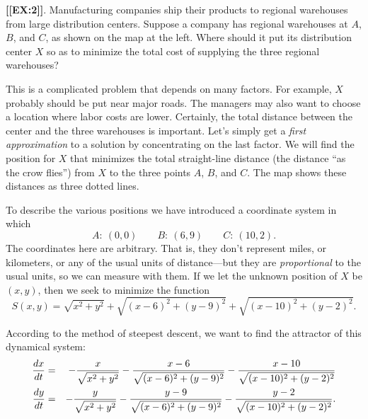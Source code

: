 {{{{




{\bf [[EX:2]]}.  Manufacturing companies ship their products to regional warehouses from large distribution centers.   Suppose a company has regional warehouses at $A$, $B$, and $C$, as shown on the map at the left.  Where should it put its distribution center $X$ so as to minimize the total cost of supplying the three regional warehouses?
\label{distribstart} 

        This is a complicated problem that depends on many factors.  For example, $X$ probably should be put near major roads.  The managers may also want to choose a location where labor costs are lower.  Certainly, the total distance between the center and the three warehouses is important.  Let's simply get a {\em first approximation\/} to a solution by concentrating on the last factor.  
We will find the position for $X$ that minimizes the total straight-line distance (the distance ``as the crow flies'') from $X$ to the three points $A$, $B$, and $C$.  The map shows these distances as three dotted lines.   

        To describe the various positions we have introduced a coordinate system in which
        \[
A: \ (0, 0) \qquad B: \  (6, 9) \qquad C: \ (10, 2).
\]
The coordinates here are arbitrary.  That is, they don't represent miles, or kilometers, or any of the usual units of distance---but they are {\em proportional\/} to the usual units, so we can measure with them.  If we let the unknown position of $X$ be $(x, y)$, then we seek to minimize the function
        \[
S(x, y) = \sqrt{x^2 + y^2} + \sqrt{(x-6)^2 + (y-9)^2} 
                + \sqrt{(x-10)^2 + (y-2)^2}.
\]

        According to the method of steepest descent, we want to find the attractor of this dynamical system:
        \begin{eqnarray*}
        {dx \over dt} &=& - {x \over \sqrt{x^2 + y^2\vphantom{(y)^2)}}} - 
                {x - 6 \over \sqrt{(x-6)^2 + (y-9)^2}} -
                {x - 10 \over \sqrt{(x-10)^2 + (y-2)^2}} \\
        {dy \over dt} &=& - {y \over \sqrt{x^2 + y^2\vphantom{(y)^2)}}} - 
                {y - 9 \over \sqrt{(x-6)^2 + (y-9)^2}} -
                {y - 2 \over \sqrt{(x-10)^2 + (y-2)^2}}.
        \end{eqnarray*}

\newpage

}}}}
